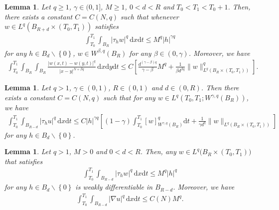 \documentclass[reqno,10pt]{amsart}
\numberwithin{equation}{section}
\newtheorem{lemma}[theorem]{Lemma}
\begin{document}
\begin{lemma}
	\label{lem11}
	Let $q\ge1$, $\gamma\in (0,1]$, $M\ge1$, $0<d<R$ and $T_0<T_1<T_0+1$. Then, there exists a constant $C=C(N,q)$ such that whenever $w\in L^q\left(B_{R+d}\times(T_0,T_1)\right)$ satisfies
	\begin{align*}
		\int_{T_0}^{T_1}\int_{B_R}|\tau_hw|^q\,\mathrm{d}x\mathrm{d}t\le M^q|h|^{\gamma q}
	\end{align*}
	for any $h\in B_d\backslash\left\lbrace 0\right\rbrace $, $w\in W^{\beta,q}(B_R)$ for any $\beta\in (0,\gamma)$. Moreover, we have
	\begin{align*}
		\int_{T_0}^{T_1}\int_{B_R}\int_{B_R}\frac{|w(x,t)-w(y,t)|^q}{|x-y|^{N+\beta q}}\,\mathrm{d}x\mathrm{d}y\mathrm{d}t\le C\left[ \frac{d^{(\gamma-\beta)q}}{\gamma-\beta}M^q+\frac{1}{\beta d^{\beta q}}\|w\|^q_{L^q\left(B_R\times(T_0,T_1)\right) }\right]. 
	\end{align*}
\end{lemma}

\begin{lemma}
	\label{lem7}
	Let $q>1$, $\gamma\in (0,1)$, $R\in(0,1)$ and $d\in (0,R)$. Then there exists a constant $C=C(N,q)$ such that for any $w\in L^q\left( T_0,T_1;W^{\gamma,q}(B_R)\right)$, we have
	\begin{align*}
		\int_{T_0}^{T_1}\int_{B_{R-d}}|\tau_hu|^q\,\mathrm{d}x\mathrm{d}t\le C|h|^{\gamma q}\left[(1-\gamma)\int_{T_0}^{T_1}[w]^q_{W^{\gamma,q}(B_R)}\mathrm{d}t+\frac{1}{\gamma d^q}\|w\|_{L^q\left( B_R\times(T_0,T_1)\right) } \right] 
	\end{align*}
	for any $h\in B_d\backslash\left\lbrace0\right\rbrace $.
\end{lemma}

\begin{lemma}
	\label{lem12.1}
	Let $q>1$, $M>0$ and $0<d<R$. Then, any $w\in L^q\bigl(B_R\times(T_0,T_1)\bigl)$ that satisfies
	\begin{align*}
		\int_{T_0}^{T_1}\int_{B_{R-d}}|\tau_hw|^q\,\mathrm{d}x\mathrm{d}t\le M^q|h|^q
	\end{align*}
	for any $h\in B_d\backslash \left\lbrace 0\right\rbrace $ is weakly differentiable in $B_{R-d}$. Moreover, we have
	\begin{align*}
		\int_{T_0}^{T_1}\int_{B_{R-d}}|\nabla u|^q\,\mathrm{d}x\mathrm{d}t\le C(N)M^q.
	\end{align*}
\end{lemma}
\end{document}
